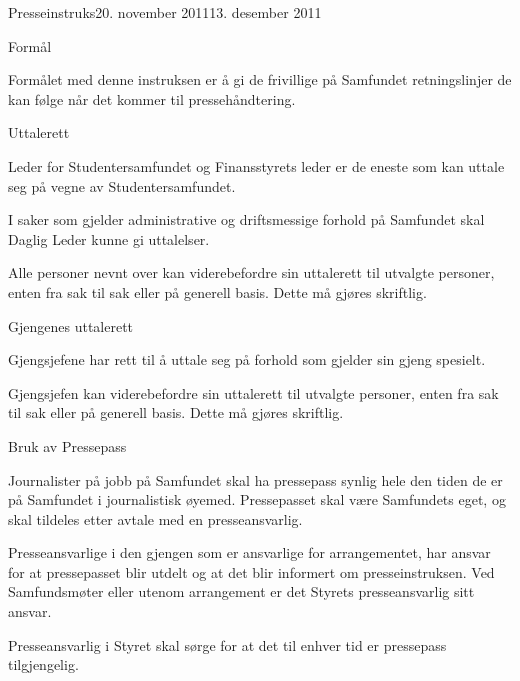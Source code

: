 \documentclass[../fsbok.tex]{subfiles}
\begin{document}
\begin{instruks}{Presseinstruks}{20. november 2011}{13. desember 2011}


    \begin{instruksledd}{Formål}

        Formålet med denne instruksen er å gi de frivillige på Samfundet retningslinjer de kan følge når det kommer til pressehåndtering.

    \end{instruksledd}


    \begin{instruksledd}{Uttalerett}

       Leder for Studentersamfundet og Finansstyrets leder er de eneste som kan uttale seg på vegne av Studentersamfundet.


I saker som gjelder administrative og driftsmessige forhold på Samfundet skal Daglig Leder kunne gi uttalelser.


Alle personer nevnt over kan viderebefordre sin uttalerett til utvalgte personer, enten fra sak til sak eller på generell basis. Dette må gjøres skriftlig.

    \end{instruksledd}


    \begin{instruksledd}{Gjengenes uttalerett}

Gjengsjefene har rett til å uttale seg på forhold som gjelder sin gjeng spesielt.


Gjengsjefen kan viderebefordre sin uttalerett til utvalgte personer, enten fra sak til sak eller på generell basis. Dette må gjøres skriftlig.

    \end{instruksledd}

\begin{instruksledd}{Bruk av Pressepass}

Journalister på jobb på Samfundet skal ha pressepass synlig hele den tiden de er på Samfundet i journalistisk øyemed. Pressepasset skal være Samfundets eget, og skal tildeles etter avtale med en presseansvarlig. 


Presseansvarlige i den gjengen som er ansvarlige for arrangementet, har ansvar for at pressepasset blir utdelt og at det blir informert om presseinstruksen. Ved Samfundsmøter eller utenom arrangement er det Styrets presseansvarlig sitt ansvar.


Presseansvarlig i Styret skal sørge for at det til enhver tid er pressepass tilgjengelig.


\end{instruksledd}
\end{instruks}
\end{document}
